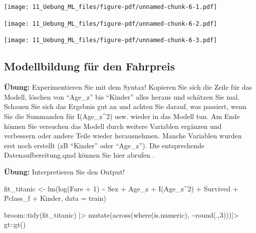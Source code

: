 \documentclass[
  10pt,
  letterpaper,
  a4paper, twoside]{scrreprt}
\newenvironment{Shaded}{\begin{snugshade}}{\end{snugshade}}
\newcommand{\AttributeTok}[1]{\textcolor[rgb]{0.40,0.45,0.13}{#1}}
\newcommand{\DecValTok}[1]{\textcolor[rgb]{0.68,0.00,0.00}{#1}}
\newcommand{\FunctionTok}[1]{\textcolor[rgb]{0.28,0.35,0.67}{#1}}
\newcommand{\NormalTok}[1]{\textcolor[rgb]{0.00,0.23,0.31}{#1}}
\newcommand{\OtherTok}[1]{\textcolor[rgb]{0.00,0.23,0.31}{#1}}
\newcommand{\SpecialCharTok}[1]{\textcolor[rgb]{0.37,0.37,0.37}{#1}}
\begin{document}
\texttt{[image: 11\_Uebung\_ML\_files/figure-pdf/unnamed-chunk-6-1.pdf]}

\texttt{[image: 11\_Uebung\_ML\_files/figure-pdf/unnamed-chunk-6-2.pdf]}

\texttt{[image: 11\_Uebung\_ML\_files/figure-pdf/unnamed-chunk-6-3.pdf]}

\subsection*{Modellbildung für den
Fahrpreis}\label{modellbildung-fuxfcr-den-fahrpreis-1}

\textbf{Übung:} Experimentieren Sie mit dem Syntax! Kopieren Sie sich
die Zeile für das Modell, löschen von \enquote{Age\_z} bis
\enquote{Kinder} alles heraus und schätzen Sie mal. Schauen Sie sich das
Ergebnis gut an und achten Sie darauf, was passiert, wenn Sie die
Summanden für I(Age\_z\^{}2) usw. wieder in das Modell tun. Am Ende
können Sie versuchen das Modell durch weitere Variablen ergänzen und
verbessern oder andere Teile wieder herausnehmen. Manche Variablen
wurden erst noch erstellt (zB \enquote{Kinder} oder \enquote{Age\_z}).
Die entsprechende Datenaufbereitung.qmd können Sie hier abrufen .

\textbf{Übung:} Interpretieren Sie den Output!

\begin{Shaded}
\begin{Highlighting}[]
\NormalTok{fit\_titanic }\OtherTok{\textless{}{-}} \FunctionTok{lm}\NormalTok{(}\FunctionTok{log}\NormalTok{(Fare }\SpecialCharTok{+} \DecValTok{1}\NormalTok{) }\SpecialCharTok{\textasciitilde{}}\NormalTok{ Sex }\SpecialCharTok{+}\NormalTok{ Age\_z }\SpecialCharTok{+} \FunctionTok{I}\NormalTok{(Age\_z}\SpecialCharTok{\^{}}\DecValTok{2}\NormalTok{) }\SpecialCharTok{+}\NormalTok{ Survived }\SpecialCharTok{+}\NormalTok{ Pclass\_f }\SpecialCharTok{+}\NormalTok{ Kinder, }\AttributeTok{data =}\NormalTok{ train)}

\NormalTok{broom}\SpecialCharTok{::}\FunctionTok{tidy}\NormalTok{(fit\_titanic) }\SpecialCharTok{|\textgreater{}}
  \FunctionTok{mutate}\NormalTok{(}\FunctionTok{across}\NormalTok{(}\FunctionTok{where}\NormalTok{(is.numeric), }\SpecialCharTok{\textasciitilde{}}\FunctionTok{round}\NormalTok{(.,}\DecValTok{3}\NormalTok{)))}\SpecialCharTok{|\textgreater{}}
\NormalTok{  gt}\SpecialCharTok{::}\FunctionTok{gt}\NormalTok{()}
\end{Highlighting}
\end{Shaded}
\end{document}
